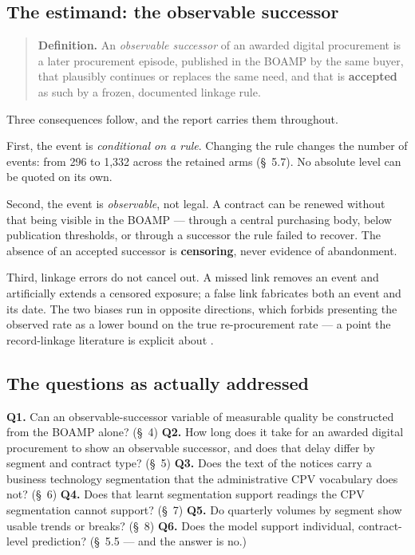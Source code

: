 \subsection{The estimand: the observable successor}

\begin{quote}
\textbf{Definition.} An \emph{observable successor} of an awarded digital procurement is a later procurement episode, published in the BOAMP by the same buyer, that plausibly continues or replaces the same need, and that is \textbf{accepted} as such by a frozen, documented linkage rule.
\end{quote}

Three consequences follow, and the report carries them throughout.

First, the event is \emph{conditional on a rule}. Changing the rule changes the number of events: from 296 to 1,332 across the retained arms (\S~5.7). No absolute level can be quoted on its own.

Second, the event is \emph{observable}, not legal. A contract can be renewed without that being visible in the BOAMP --- through a central purchasing body, below publication thresholds, or through a successor the rule failed to recover. The absence of an accepted successor is \textbf{censoring}, never evidence of abandonment.

Third, linkage errors do not cancel out. A missed link removes an event and artificially extends a censored exposure; a false link fabricates both an event and its date. The two biases run in opposite directions, which forbids presenting the observed rate as a lower bound on the true re-procurement rate --- a point the record-linkage literature is explicit about \citep{doidge2019}.

\subsection{The questions as actually addressed}

\textbf{Q1.} Can an observable-successor variable of measurable quality be constructed from the BOAMP alone? (\S~4)
\textbf{Q2.} How long does it take for an awarded digital procurement to show an observable successor, and does that delay differ by segment and contract type? (\S~5)
\textbf{Q3.} Does the text of the notices carry a business technology segmentation that the administrative CPV vocabulary does not? (\S~6)
\textbf{Q4.} Does that learnt segmentation support readings the CPV segmentation cannot support? (\S~7)
\textbf{Q5.} Do quarterly volumes by segment show usable trends or breaks? (\S~8)
\textbf{Q6.} Does the model support individual, contract-level prediction? (\S~5.5 --- and the answer is no.)
